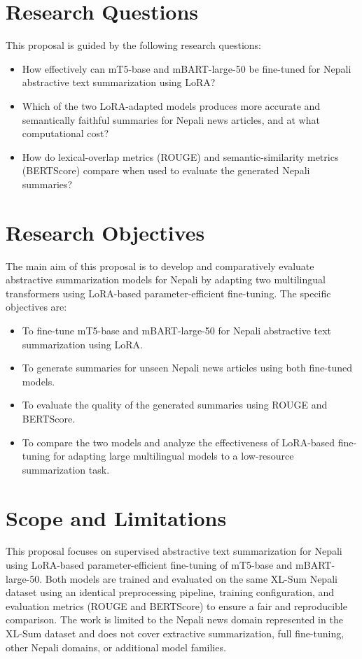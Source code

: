 \documentclass[12pt]{report}
\begin{document}
\section{Research Questions}
This proposal is guided by the following research questions:
\begin{itemize}
    \item How effectively can mT5-base and mBART-large-50 be fine-tuned for Nepali abstractive text summarization using LoRA?
    \item Which of the two LoRA-adapted models produces more accurate and semantically faithful summaries for Nepali news articles, and at what computational cost?
    \item How do lexical-overlap metrics (ROUGE) and semantic-similarity metrics (BERTScore) compare when used to evaluate the generated Nepali summaries?
\end{itemize}


\section{Research Objectives}
The main aim of this proposal is to develop and comparatively evaluate abstractive summarization models for Nepali by adapting two multilingual transformers using LoRA-based parameter-efficient fine-tuning. The specific objectives are:
\begin{itemize}
    \item To fine-tune mT5-base and mBART-large-50 for Nepali abstractive text summarization using LoRA.
    \item To generate summaries for unseen Nepali news articles using both fine-tuned models.
    \item To evaluate the quality of the generated summaries using ROUGE and BERTScore.
    \item To compare the two models and analyze the effectiveness of LoRA-based fine-tuning for adapting large multilingual models to a low-resource summarization task.
\end{itemize}


\section{Scope and Limitations}
This proposal focuses on supervised abstractive text summarization for Nepali using LoRA-based parameter-efficient fine-tuning of mT5-base and mBART-large-50. Both models are trained and evaluated on the same XL-Sum Nepali dataset using an identical preprocessing pipeline, training configuration, and evaluation metrics (ROUGE and BERTScore) to ensure a fair and reproducible comparison. The work is limited to the Nepali news domain represented in the XL-Sum dataset and does not cover extractive summarization, full fine-tuning, other Nepali domains, or additional model families.
\end{document}
